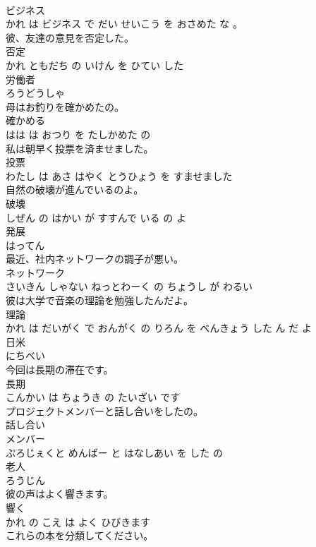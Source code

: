 \documentclass[8pt]{extreport}
\begin{document}
\begin{CJK}{UTF8}{min}
\\	ビジネス 
\\	かれ は ビジネス で だい せいこう を おさめた な 。			
\\	彼、友達の意見を否定した。	
\\	否定 
\\	かれ ともだち の いけん を ひてい した			
\\	労働者	
\\	ろうどうしゃ		
\\	母はお釣りを確かめたの。	
\\	確かめる 
\\	はは は おつり を たしかめた の			
\\	私は朝早く投票を済ませました。	
\\	投票 
\\	わたし は あさ はやく とうひょう を すませました			
\\	自然の破壊が進んでいるのよ。	
\\	破壊 
\\	しぜん の はかい が すすんで いる の よ			
\\	発展	
\\	はってん		
\\	最近、社内ネットワークの調子が悪い。	
\\	ネットワーク 
\\	さいきん しゃない ねっとわーく の ちょうし が わるい			
\\	彼は大学で音楽の理論を勉強したんだよ。	
\\	理論 
\\	かれ は だいがく で おんがく の りろん を べんきょう した ん だ よ			
\\	日米	
\\	にちべい		
\\	今回は長期の滞在です。	
\\	長期 
\\	こんかい は ちょうき の たいざい です			
\\	プロジェクトメンバーと話し合いをしたの。	
\\	話し合い 
\\	メンバー 
\\	ぷろじぇくと めんばー と はなしあい を した の			
\\	老人	
\\	ろうじん		
\\	彼の声はよく響きます。	
\\	響く 
\\	かれ の こえ は よく ひびきます			
\\	これらの本を分類してください。	

\end{CJK}
\end{document}
